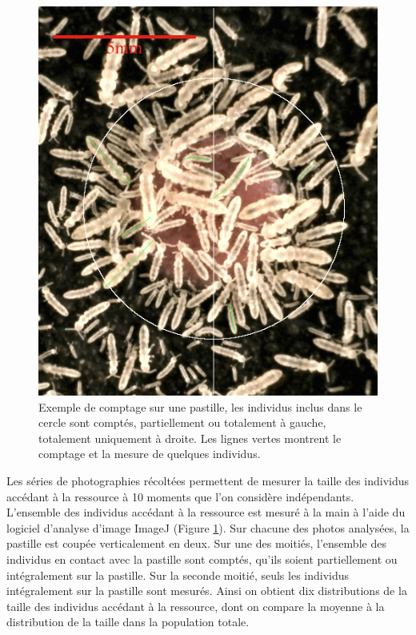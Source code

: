 \begin{figure}[!ht]
\begin{center}
\includegraphics[height=0.25\textheight]{1_CorpsDeThese/Resumes/Fig/SM01b}
\caption[Exemple de comptage
sur une pastille]{Exemple de comptage
sur une pastille, les individus inclus dans le cercle sont comptés,
partiellement ou totalement à gauche, totalement uniquement à droite. Les
lignes vertes montrent le comptage et la mesure de quelques individus.}
\label{fig:SM1b}
\end{center}
\end{figure}

Les séries de photographies récoltées permettent de mesurer la taille des
individus accédant à la ressource à 10 moments que l'on considère indépendants.
L'ensemble des individus accédant à la ressource est mesuré à la main à l'aide
du logiciel d'analyse d'image ImageJ (Figure \ref{fig:SM1b}). Sur chacune des
photos analysées, la pastille est coupée verticalement en deux. Sur une des moitiés, l'ensemble des
individus en contact avec la pastille sont comptés, qu'ils soient partiellement
ou intégralement sur la pastille. Sur la seconde moitié, seuls les individus
intégralement sur la pastille sont mesurés. Ainsi on obtient dix distributions
de la taille des individus accédant à la ressource, dont on compare la moyenne à
la distribution de la taille dans la population totale.

